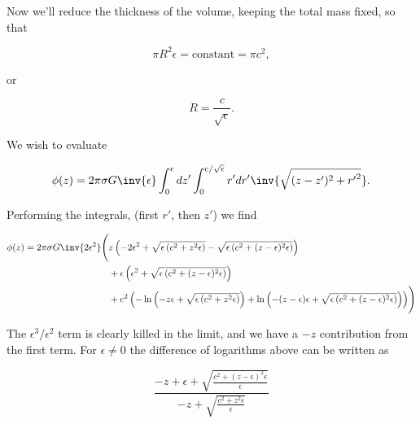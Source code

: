 Now we'll reduce the thickness of the volume, keeping the total mass fixed, so that

\begin{equation}\label{eqn:classicalMechanicsPs2:n}
\pi R^2 \epsilon = \text{constant} = \pi c^2,
\end{equation}

or

\begin{equation}\label{eqn:classicalMechanicsPs2:n}
R = \frac{c}{\sqrt{\epsilon}}.
\end{equation}

We wish to evaluate

\begin{equation}\label{eqn:classicalMechanicsPs2:n}
\phi(z) 
= 
2 \pi \sigma G 
\inv{\epsilon} 
\int_0^\epsilon dz' \int_0^{c/\sqrt{\epsilon}} r' dr' \inv{\sqrt{(z-z')^2 + {r'}^2}}.
\end{equation}

Performing the integrals, (first $r'$, then $z'$) we find

\begin{equation}\label{eqn:classicalMechanicsPs2:n}
\begin{aligned}
\phi(z) = 2 \pi \sigma G \inv{2 \epsilon^2}
\Biggl(
&z \left(-2 \epsilon ^2+\sqrt{\epsilon  \left(c^2+z^2 \epsilon \right)}-\sqrt{\epsilon  \left(c^2+(z-\epsilon )^2 \epsilon \right)}\right) \\
&+\epsilon  \left(\epsilon ^2+\sqrt{\epsilon  \left(c^2+(z-\epsilon )^2 \epsilon \right)}\right) \\
&+c^2 \left(-\ln \left(-z \epsilon +\sqrt{\epsilon  \left(c^2+z^2 \epsilon \right)}\right)+\ln \left(-(z - \epsilon) \epsilon +\sqrt{\epsilon  \left(c^2+(z-\epsilon )^2 \epsilon \right)}\right)\right)
\Biggr)
\end{aligned}
\end{equation}

The $\epsilon^3/\epsilon^2$ term is clearly killed in the limit, and we have a $-z$ contribution from the first term.  For $\epsilon \ne 0$ the difference of logarithms above can be written as

\begin{equation}\label{eqn:classicalMechanicsPs2:n}
\frac{-z+\epsilon +\sqrt{\frac{c^2+(z-\epsilon )^2 \epsilon }{\epsilon }}}{-z+\sqrt{\frac{c^2+z^2 \epsilon }{\epsilon }}}
\end{equation}

